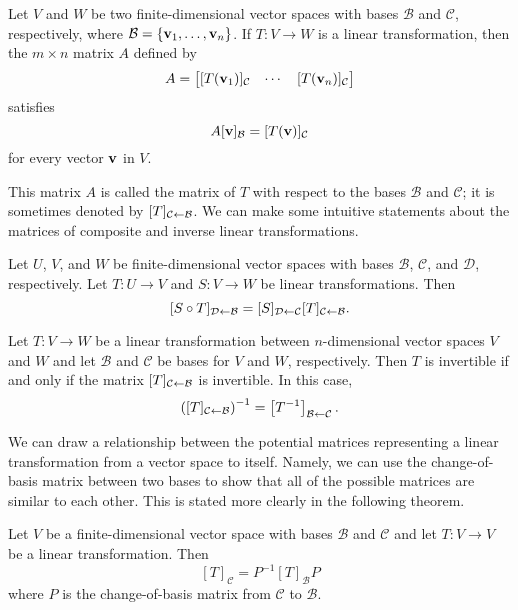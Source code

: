 \documentclass[../m073main.tex]{subfiles}
\begin{document}
\begin{theorem}
	Let $V$ and $W$ be two finite-dimensional vector spaces with bases $\mathcal{B}$ and $\mathcal{C}$, respectively, where $\mathcal{B} = \{\mathbf{v}_1, \ldots, \mathbf{v}_n\}$.
	If $T : V \to W$ is a linear transformation, then the $m \times n$ matrix $A$ defined by
	\[ A = \begin{bmatrix} [T(\mathbf{v}_1)]_{\mathcal{C}} & \cdots & [T(\mathbf{v}_n)]_{\mathcal{C}} \end{bmatrix} \]
	satisfies
	\[ A [\mathbf{v}]_{\mathcal{B}} = [T(\mathbf{v})]_{\mathcal{C}} \]
	for every vector $\mathbf{v}$ in $V$.
\end{theorem}

This matrix $A$ is called the matrix of $T$ with respect to the bases $\mathcal{B}$ and $\mathcal{C}$; it is sometimes denoted by $[T]_{\mathcal{C} \leftarrow \mathcal{B}}$.
We can make some intuitive statements about the matrices of composite and inverse linear transformations.

\begin{theorem}
	Let $U$, $V$, and $W$ be finite-dimensional vector spaces with bases $\mathcal{B}$, $\mathcal{C}$, and $\mathcal{D}$, respectively.
	Let $T : U \to V$ and $S : V \to W$ be linear transformations.
	Then
	\[ [S \circ T]_{\mathcal{D} \leftarrow \mathcal{B}} = [S]_{\mathcal{D} \leftarrow \mathcal{C}} [T]_{\mathcal{C} \leftarrow \mathcal{B}}. \]
\end{theorem}

\begin{theorem}
	Let $T : V \to W$ be a linear transformation between $n$-dimensional vector spaces $V$ and $W$ and let $\mathcal{B}$ and $\mathcal{C}$ be bases for $V$ and $W$, respectively.
	Then $T$ is invertible if and only if the matrix $[T]_{\mathcal{C} \leftarrow \mathcal{B}}$ is invertible.
	In this case,
	\[ \left( [T]_{\mathcal{C} \leftarrow \mathcal{B}} \right)^{-1} = \left[ T^{-1} \right]_{\mathcal{B} \leftarrow \mathcal{C}}. \]
\end{theorem}

We can draw a relationship between the potential matrices representing a linear transformation from a vector space to itself.
Namely, we can use the change-of-basis matrix between two bases to show that all of the possible matrices are similar to each other.
This is stated more clearly in the following theorem.

\begin{theorem}
	Let $V$ be a finite-dimensional vector space with bases $\mathcal{B}$ and $\mathcal{C}$ and let $T : V \to V$ be a linear transformation.
	Then
	\[ [T]_{\mathcal{C}} = P^{-1}[T]_{\mathcal{B}}P \]
	where $P$ is the change-of-basis matrix from $\mathcal{C}$ to $\mathcal{B}$.
\end{theorem}
\end{document}
